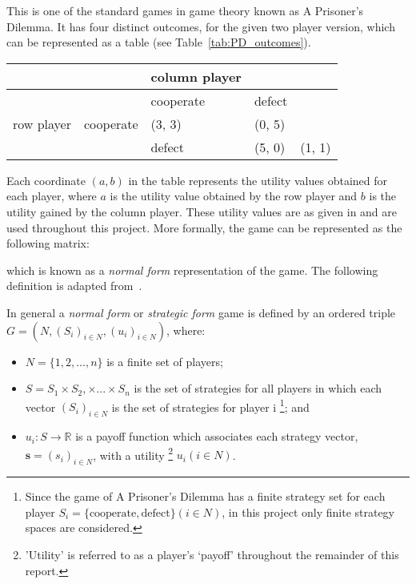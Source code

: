This is one of the standard games in game theory known as A Prisoner's Dilemma.
It has four distinct outcomes, for the given two player version, which can be represented as a table (see
Table~\ref{tab:PD_outcomes}).
\begin{tabular}{|c|}\label{tab:PD_outcomes}
    \hline
      &  & column player & \\
    \hline 
      &  & cooperate & defect\\
    \hline
    row player & cooperate & (3, 3) & (0, 5)\\
    \hline 
      &  & defect & (5, 0) & (1, 1)\\
    \hline
\end{tabular}
Each coordinate \((a, b)\) in the table represents the utility values obtained
for each player, where  \(a\) is the utility value obtained by the row player
and \(b\) is the utility gained by the column player. These utility values are
as given in \cite{axelrod1980effective} and are used throughout this project.
More formally, the game can be represented as the following matrix:

\label{PDMatrix}

which is known as a \emph{normal form} representation of the game. The following
definition is adapted from~\cite{maschler_solan_zamir_2013}.

In general a \textit{normal form} or \textit{strategic form} game is defined by
an ordered triple \(G = (N, (S_i)_{i \in N}, (u_i)_{i \in N})\), where:
\begin{itemize}
    \item \(N = \{1, 2,..., n\}\) is a finite set of players;
    \item \(S = S_1 \times S_2, \times ... \times S_n\) is the set of strategies
    for all players in which each vector \((S_i)_{i \in N}\) is the set of
    strategies for player i \footnote{Since the game of A Prisoner's Dilemma has
    a finite strategy set for each player \(S_i = \{ \text{cooperate},
    \text{defect}\} (i \in N)\), in this project only finite strategy spaces are
    considered.}; and
    \item \(u_i : S \to \mathbb{R}\) is a payoff function which associates each
    strategy vector, \(\textbf{s} = (s_i)_{i \in N}\), with a utility
    \footnote{'Utility' is referred to as a player's `payoff' throughout the
    remainder of this report.} \(u_i(i \in N)\).
\end{itemize}

